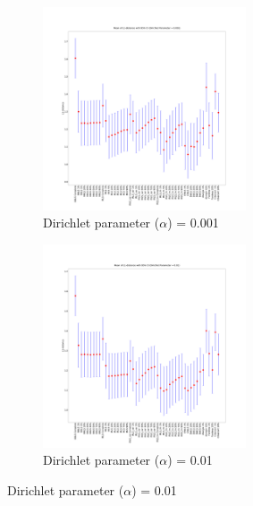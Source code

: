 \documentclass[10pt, a4paper, oneside]{article}
\begin{document}
\begin{figure}
    \centering
    \begin{subfigure}{6cm}
        \centering\includegraphics[width=6cm]{Figure2/0.001_L1}
        \caption{Dirichlet parameter ($\alpha$) = 0.001}
    \end{subfigure}
    \begin{subfigure}{6cm}
        \centering\includegraphics[width=6cm]{Figure2/0.01_L1}
        \caption{Dirichlet parameter ($\alpha$) = 0.01}
    \end{subfigure}


\end{figure}
\end{document}
